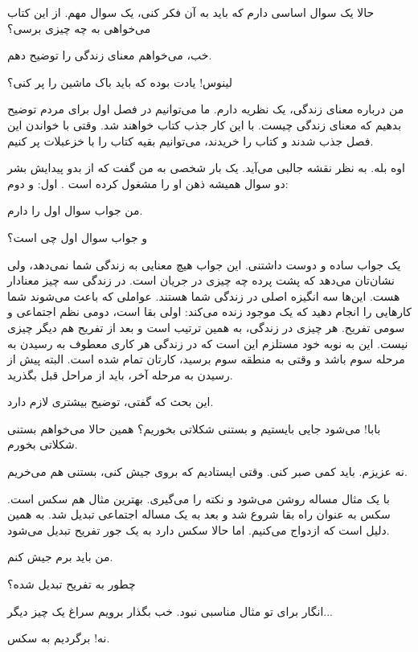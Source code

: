 \begin{dialogue}
\david
 حالا یک سوال اساسی دارم که باید به آن فکر کنی، یک سوال
مهم. از این کتاب می‌خواهی به چه چیزی برسی؟

\linus
خب، می‌خواهم معنای زندگی را توضیح دهم.

\tove
لینوس! یادت بوده که باید باک ماشین را پر کنی؟

\linus
من درباره معنای زندگی، یک نظریه دارم. ما می‌توانیم در فصل
اول برای مردم توضیح بدهیم که معنای زندگی چیست. با این کار جذب کتاب
خواهند شد. وقتی با خواندن این فصل جذب شدند و کتاب را خریدند، می‌توانیم
بقیه کتاب را با خزعبلات پر کنیم.

\david
اوه بله. به نظر نقشه جالبی می‌آید. یک بار شخصی به من گفت که
از بدو پیدایش بشر دو سوال همیشه ذهن او را مشغول کرده است . اول:
 و دوم: 

\linus
من جواب سوال اول را دارم. 

\david
و جواب سوال اول چی است؟

\linus
یک جواب ساده و دوست داشتنی. این جواب هیچ معنایی به زندگی
شما نمی‌دهد، ولی نشان‌تان می‌دهد که پشت پرده چه چیزی در جریان است. در
زندگی سه چیز معنادار هست. این‌ها سه انگیزه اصلی در زندگی شما
هستند. عواملی که باعث می‌شوند شما کارهایی را انجام دهید که یک موجود
زنده می‌کند: اولی بقا است، دومی نظم اجتماعی و سومی تفریح. هر چیزی در
زندگی، به همین ترتیب است و بعد از تفریح هم دیگر چیزی نیست. این به نوبه
خود مستلزم این است که در زندگی هر کاری معطوف به رسیدن به مرحله سوم
باشد و وقتی به منطقه سوم برسید، کارتان تمام شده است. البته پیش از
رسیدن به مرحله آخر، باید از مراحل قبل بگذرید.

\david
این بحث که گفتی‌، توضیح بیشتری لازم دارد.

\patricia
بابا! می‌شود جایی بایستیم و بستنی شکلاتی بخوریم؟ همین حالا
می‌خواهم بستنی شکلاتی بخورم.

\tove
نه عزیزم. باید کمی صبر کنی. وقتی ایستادیم که بروی جیش کنی،
بستنی هم می‌خریم.

\linus
با یک مثال مساله روشن می‌شود و نکته را می‌گیری. بهترین مثال
هم سکس است. سکس به عنوان راه بقا شروع شد و بعد به یک مساله اجتماعی
تبدیل شد. به همین دلیل است که ازدواج می‌کنیم. اما حالا سکس دارد به یک
جور تفریح تبدیل می‌شود.

\patricia
من باید برم جیش کنم.

\david
چطور به تفریح تبدیل شده؟

\linus
انگار برای تو مثال مناسبی نبود. خب بگذار برویم سراغ یک چیز
دیگر...

\david
نه! برگردیم به سکس.


\end{dialogue}
